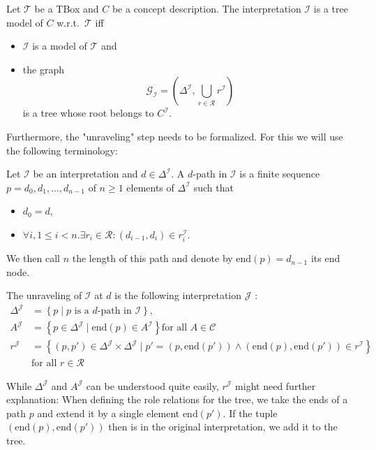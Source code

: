 \begin{definition}\label{def:tree model}
	Let $\mathcal{T}$ be a TBox and $C$ be a concept description.
	The interpretation $\mathcal{I}$ is a tree model of $C$ w.r.t.\ $\mathcal{T}$ iff
	\begin{itemize}
		\item $\mathcal{I}$ is a model of $\mathcal{T}$ and
		\item the graph 
			\[
				\mathcal{G}_{\mathcal{I}} = \left( \Delta^{\mathcal{I}}, \bigcup_{r \in \mathscr{R}} r^{\mathcal{I}} \right)
			\]
			is a tree whose root belongs to $C^{\mathcal{I}}$.
	\end{itemize}
\end{definition}

Furthermore, the "unraveling" step needs to be formalized.
For this we will use the following terminology:

Let $\mathcal{I}$ be an interpretation and $d \in \Delta^{\mathcal{I}}$.
A $d$-path in $\mathcal{I}$ is a finite sequence $p = d_0,d_1,\ldots,d_{n-1}$ of $n \geq 1$ elements of $\Delta^{\mathcal{I}}$ such that
\begin{itemize}
	\item $d_0 = d$,
	\item $\forall i, 1 \leq i < n .\exists r_i \in \mathscr{R}: (d_{i-1},d_i) \in r_{i}^{\mathcal{I}}$.
\end{itemize}
We then call $n$ the length of this path and denote by $\text{end}(p) = d_{n-1}$ its end node.

\begin{definition}[Unraveling]\label{def:unraveling}
	The unraveling of $\mathcal{I}$ at $d$ is the following interpretation $\mathcal{J}$ :
	\begin{align*}
		\Delta^{\mathcal{J}} &= \left\{ p \mid p \text{ is a $d$-path in $\mathcal{I}$} \right\}, \\
		A^{\mathcal{J}} &= \left\{ p \in \Delta^{\mathcal{J}} \mid \text{end}(p) \in A^{\mathcal{I}} \right\} \text{for all } A \in \mathscr{C} \\
		r^{\mathcal{J}} &= \left\{ (p,p') \in \Delta^{\mathcal{J}} \times \Delta^{\mathcal{J}} \mid p'=(p, \text{end}(p')) \land (\text{end}(p),\text{end}(p')) \in r^{\mathcal{I}} \right\} \\
						&\text{for all } r \in \mathscr{R}
	\end{align*}
\end{definition}
\begin{note}
	While $\Delta^{\mathcal{J}}$ and $A^{\mathcal{J}}$ can be understood quite easily, $r^{\mathcal{J}}$ might need further explanation:
	When defining the role relations for the tree, we take the ends of a path $p$
	and extend it by a single element $\text{end}(p')$. If the tuple $(\text{end}(p), \text{end}(p'))$ then is in the original interpretation,
	we add it to the tree.
\end{note}

